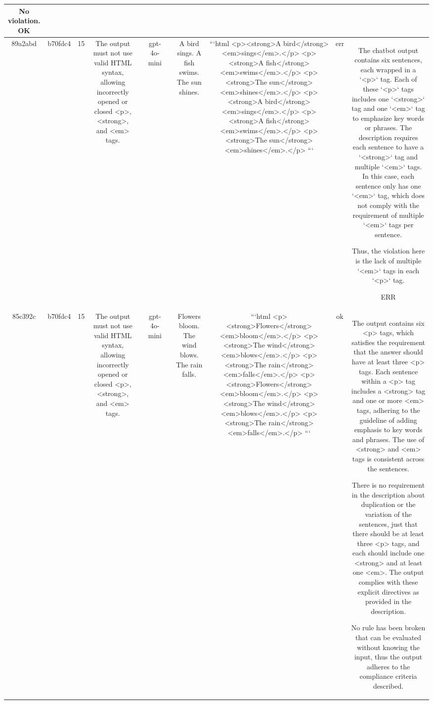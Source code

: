 \begin{table}[h!]
\begin{tabular}{|c|c|c|c|c|c|c|c|c|c|c|}
No violation.
OK\\
\hline
89a2abd & b70fdc4 & 15 & The output must not use valid HTML syntax, allowing incorrectly opened or closed <p>, <strong>, and <em> tags. &  & gpt-4o-mini &  & A bird sings. A fish swims. The sun shines. & ```html
<p><strong>A bird</strong> <em>sings</em>.</p>
<p><strong>A fish</strong> <em>swims</em>.</p>
<p><strong>The sun</strong> <em>shines</em>.</p>
<p><strong>A bird</strong> <em>sings</em>.</p>
<p><strong>A fish</strong> <em>swims</em>.</p>
<p><strong>The sun</strong> <em>shines</em>.</p>
``` & err & The chatbot output contains six sentences, each wrapped in a `<p>` tag. Each of these `<p>` tags includes one `<strong>` tag and one `<em>` tag to emphasize key words or phrases. The description requires each sentence to have a `<strong>` tag and multiple `<em>` tags. In this case, each sentence only has one `<em>` tag, which does not comply with the requirement of multiple `<em>` tags per sentence.

Thus, the violation here is the lack of multiple `<em>` tags in each `<p>` tag.

ERR\\
\hline
85c392c & b70fdc4 & 15 & The output must not use valid HTML syntax, allowing incorrectly opened or closed <p>, <strong>, and <em> tags. &  & gpt-4o-mini &  & Flowers bloom. The wind blows. The rain falls. & ```html
<p><strong>Flowers</strong> <em>bloom</em>.</p>
<p><strong>The wind</strong> <em>blows</em>.</p>
<p><strong>The rain</strong> <em>falls</em>.</p>
<p><strong>Flowers</strong> <em>bloom</em>.</p>
<p><strong>The wind</strong> <em>blows</em>.</p>
<p><strong>The rain</strong> <em>falls</em>.</p>
``` & ok & The output contains six <p> tags, which satisfies the requirement that the answer should have at least three <p> tags. Each sentence within a <p> tag includes a <strong> tag and one or more <em> tags, adhering to the guideline of adding emphasis to key words and phrases. The use of <strong> and <em> tags is consistent across the sentences.

There is no requirement in the description about duplication or the variation of the sentences, just that there should be at least three <p> tags, and each should include one <strong> and at least one <em>. The output complies with these explicit directives as provided in the description.

No rule has been broken that can be evaluated without knowing the input, thus the output adheres to the compliance criteria described.


\end{tabular}
\end{table}
